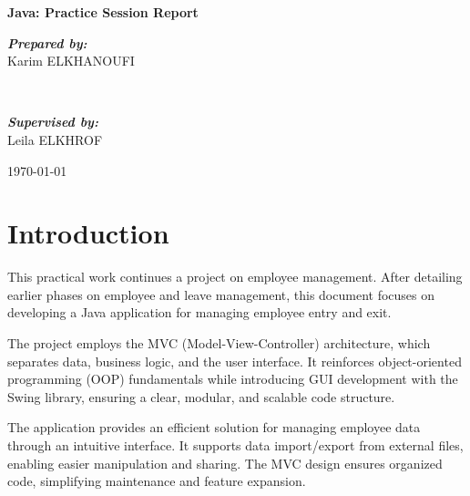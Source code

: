\documentclass[12pt]{article}
\begin{document}
\begin{titlepage}
    \thispagestyle{empty}

        \vspace*{2cm}
        \Huge\textbf{\textcolor{centrale_red}{Java: Practice Session Report}} \\
        \vspace{1cm}

        \begin{minipage}{0.4\textwidth}
                \begin{flushleft} \large
                    \emph{\textbf{Prepared by:}}\\ 
                    Karim ELKHANOUFI
                \end{flushleft}
            \end{minipage}
            ~
            \begin{minipage}{0.4\textwidth}
                \begin{flushright} \large
					\emph{\textbf{Supervised by:}}\\
                    Leila ELKHROF
                \end{flushright}
            \end{minipage}

        \vfill
        \large{\today}
\end{titlepage}

\newpage

\tableofcontents

\newpage

\section{Introduction}
This practical work continues a project on employee management. After detailing earlier phases on employee and leave management, this document focuses on developing a Java application for managing employee entry and exit.

The project employs the MVC (Model-View-Controller) architecture, which separates data, business logic, and the user interface. It reinforces object-oriented programming (OOP) fundamentals while introducing GUI development with the Swing library, ensuring a clear, modular, and scalable code structure.

The application provides an efficient solution for managing employee data through an intuitive interface. It supports data import/export from external files, enabling easier manipulation and sharing. The MVC design ensures organized code, simplifying maintenance and feature expansion.
\end{document}
